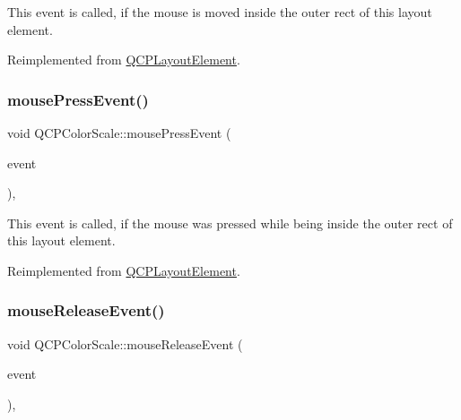 This event is called, if the mouse is moved inside the outer rect of this layout element. 

Reimplemented from \mbox{\hyperlink{class_q_c_p_layout_element_a14f4acf58cdb8dd2c6c571479c4c4a40}{Q\+C\+P\+Layout\+Element}}.

\mbox{\label{class_q_c_p_color_scale_a5df6ad81b2ad045878d276c2d5be7120}} 
\subsubsection{\texorpdfstring{mouse\+Press\+Event()}{mousePressEvent()}}
{\footnotesize\ttfamily void Q\+C\+P\+Color\+Scale\+::mouse\+Press\+Event (\begin{DoxyParamCaption}\item[{Q\+Mouse\+Event $\ast$}]{event }\end{DoxyParamCaption})\hspace{0.3cm}{\ttfamily [protected]}, {\ttfamily [virtual]}}

This event is called, if the mouse was pressed while being inside the outer rect of this layout element. 

Reimplemented from \mbox{\hyperlink{class_q_c_p_layout_element_a2d82ea21fe0ee628f177bd824bc51a71}{Q\+C\+P\+Layout\+Element}}.

\mbox{\label{class_q_c_p_color_scale_a0916613d20901950fc6d00c6f99fe0a1}} 
\subsubsection{\texorpdfstring{mouse\+Release\+Event()}{mouseReleaseEvent()}}
{\footnotesize\ttfamily void Q\+C\+P\+Color\+Scale\+::mouse\+Release\+Event (\begin{DoxyParamCaption}\item[{Q\+Mouse\+Event $\ast$}]{event }\end{DoxyParamCaption})\hspace{0.3cm}{\ttfamily [protected]}, {\ttfamily [virtual]}}

